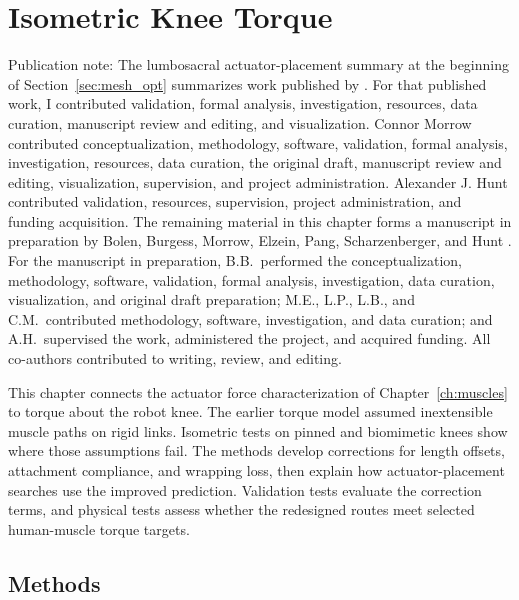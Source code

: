 \chapter{Isometric Knee Torque}\label{ch:torque}\label{ch:results}
\graphicspath{{../Figures/30-torque/}{figs/30-torque/}}

{\doublespacing\normalsize\upshape
\noindent Publication note: The lumbosacral actuator-placement summary at the beginning of Section~\ref{sec:mesh_opt} summarizes work published by \citet{morrow_optimization_2020}. For that published work, I contributed validation, formal analysis, investigation, resources, data curation, manuscript review and editing, and visualization. Connor Morrow contributed conceptualization, methodology, software, validation, formal analysis, investigation, resources, data curation, the original draft, manuscript review and editing, visualization, supervision, and project administration. Alexander J. Hunt contributed validation, resources, supervision, project administration, and funding acquisition. The remaining material in this chapter forms a manuscript in preparation by Bolen, Burgess, Morrow, Elzein, Pang, Scharzenberger, and Hunt \citep{bolen_isometric_2025}. For the manuscript in preparation, B.B.\ performed the conceptualization, methodology, software, validation, formal analysis, investigation, data curation, visualization, and original draft preparation; M.E., L.P., L.B., and C.M.\ contributed methodology, software, investigation, and data curation; and A.H.\ supervised the work, administered the project, and acquired funding. All co-authors contributed to writing, review, and editing.\par}

This chapter connects the actuator force characterization of Chapter~\ref{ch:muscles} to torque about the robot knee. The earlier torque model assumed inextensible muscle paths on rigid links. Isometric tests on pinned and biomimetic knees show where those assumptions fail. The methods develop corrections for length offsets, attachment compliance, and wrapping loss, then explain how actuator-placement searches use the improved prediction. Validation tests evaluate the correction terms, and physical tests assess whether the redesigned routes meet selected human-muscle torque targets.

\section{Methods}

